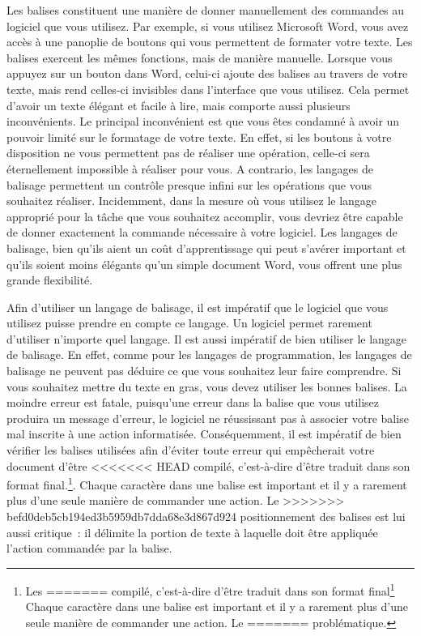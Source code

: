 \documentclass[
  letterpaper,
]{scrbook}
\begin{document}
Les balises constituent une manière de donner manuellement des commandes
au logiciel que vous utilisez. Par exemple, si vous utilisez Microsoft
Word, vous avez accès à une panoplie de boutons qui vous permettent de
formater votre texte. Les balises exercent les mêmes fonctions, mais de
manière manuelle. Lorsque vous appuyez sur un bouton dans Word, celui-ci
ajoute des balises au travers de votre texte, mais rend celles-ci
invisibles dans l'interface que vous utilisez. Cela permet d'avoir un
texte élégant et facile à lire, mais comporte aussi plusieurs
inconvénients. Le principal inconvénient est que vous êtes condamné à
avoir un pouvoir limité sur le formatage de votre texte. En effet, si
les boutons à votre disposition ne vous permettent pas de réaliser une
opération, celle-ci sera éternellement impossible à réaliser pour vous.
A contrario, les langages de balisage permettent un contrôle presque
infini sur les opérations que vous souhaitez réaliser. Incidemment, dans
la mesure où vous utilisez le langage approprié pour la tâche que vous
souhaitez accomplir, vous devriez être capable de donner exactement la
commande nécessaire à votre logiciel. Les langages de balisage, bien
qu'ils aient un coût d'apprentissage qui peut s'avérer important et
qu'ils soient moins élégants qu'un simple document Word, vous offrent
une plus grande flexibilité.

Afin d'utiliser un langage de balisage, il est impératif que le logiciel
que vous utilisez puisse prendre en compte ce langage. Un logiciel
permet rarement d'utiliser n'importe quel langage. Il est aussi
impératif de bien utiliser le langage de balisage. En effet, comme pour
les langages de programmation, les langages de balisage ne peuvent pas
déduire ce que vous souhaitez leur faire comprendre. Si vous souhaitez
mettre du texte en gras, vous devez utiliser les bonnes balises. La
moindre erreur est fatale, puisqu'une erreur dans la balise que vous
utilisez produira un message d'erreur, le logiciel ne réussissant pas à
associer votre balise mal inscrite à une action informatisée.
Conséquemment, il est impératif de bien vérifier les balises utilisées
afin d'éviter toute erreur qui empêcherait votre document d'être
<<<<<<< HEAD
compilé, c'est-à-dire d'être traduit dans son format final.\footnote{Les
=======
compilé, c'est-à-dire d'être traduit dans son format final\footnote{Les
>>>>>>> befd0deb5cb194ed3b5959db7dda68e3d867d924
  logiciels permettent plus ou moins efficacement d'identifier les
  balises problématiques. Certains ne produisent qu'un message d'erreur
  sans donner d'indication sur la source du problème, alors que d'autres
  ciblent très spécifiquement la ligne de syntaxe où se situe la balise
<<<<<<< HEAD
  problématique.} Chaque caractère dans une balise est important et il y
a rarement plus d'une seule manière de commander une action. Le
=======
  problématique.}. Chaque caractère dans une balise est important et il
y a rarement plus d'une seule manière de commander une action. Le
>>>>>>> befd0deb5cb194ed3b5959db7dda68e3d867d924
positionnement des balises est lui aussi critique~: il délimite la
portion de texte à laquelle doit être appliquée l'action commandée par
la balise.
\end{document}
